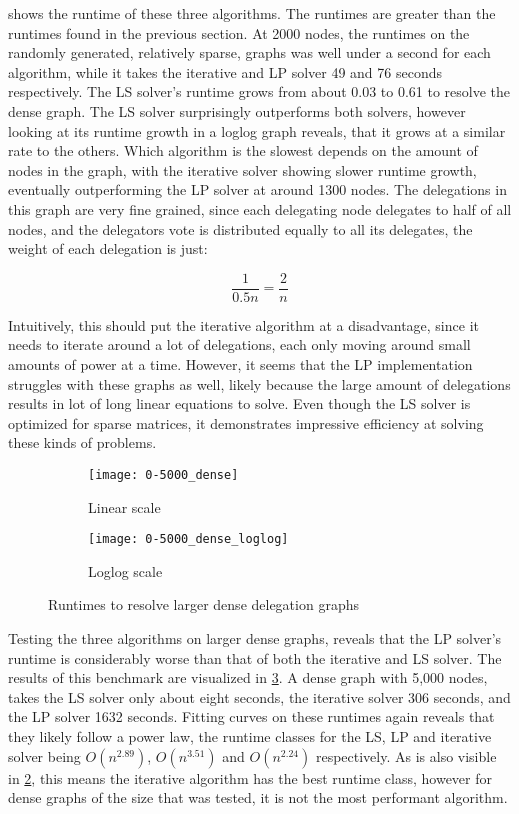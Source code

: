  shows the runtime of these three algorithms. The runtimes are greater than the runtimes found in the previous section. At 2000 nodes, the runtimes on the randomly generated, relatively sparse, graphs was well under a second for each algorithm, while it takes the iterative and LP solver 49 and 76 seconds respectively. The LS solver's runtime grows from about 0.03 to 0.61 to resolve the dense graph. The LS solver surprisingly outperforms both solvers, however looking at its runtime growth in a loglog graph reveals, that it grows at a similar rate to the others. Which algorithm is the slowest depends on the amount of nodes in the graph, with the iterative solver showing slower runtime growth, eventually outperforming the LP solver at around 1300 nodes. The delegations in this graph are very fine grained, since each delegating node delegates to half of all nodes, and the delegators vote is distributed equally to all its delegates, the weight of each delegation is just:

\[ 
\frac{1}{0.5n} = \frac{2}{n} 
\]

Intuitively, this should put the iterative algorithm at a disadvantage, since it needs to iterate around a lot of delegations, each only moving around small amounts of power at a time. However, it seems that the LP implementation struggles with these graphs as well, likely because the large amount of delegations results in lot of long linear equations to solve. Even though the LS solver is optimized for sparse matrices, it demonstrates impressive efficiency at solving these kinds of problems.

\begin{figure}[t]
    \centering
    \begin{subfigure}[t]{0.45\textwidth}
    	\centering
    	\texttt{[image: 0-5000\_dense]}
    	\caption{Linear scale}
    	\label{subfig:dense-large-linear}
    \end{subfigure}
    \hfill
    \begin{subfigure}[t]{0.45\textwidth}
        \centering
        \texttt{[image: 0-5000\_dense\_loglog]}
        \caption{Loglog scale}
         \label{subfig:dense-large-loglog}
    \end{subfigure}
    \caption{Runtimes to resolve larger dense delegation graphs}
    \label{fig:dense-large}
\end{figure}

Testing the three algorithms on larger dense graphs, reveals that the LP solver's runtime is considerably worse than that of both the iterative and LS solver. The results of this benchmark are visualized in \cref{fig:dense-large}. A dense graph with 5,000 nodes, takes the LS solver only about eight seconds, the iterative solver 306 seconds, and the LP solver 1632 seconds. Fitting curves on these runtimes again reveals that they likely follow a power law, the runtime classes for the LS, LP and iterative solver being $O(n^{2.89})$, $O(n^{3.51})$ and $O(n^{2.24})$ respectively. As is also visible in \cref{subfig:dense-large-loglog}, this means the iterative algorithm has the best runtime class, however for dense graphs of the size that was tested, it is not the most performant algorithm.

